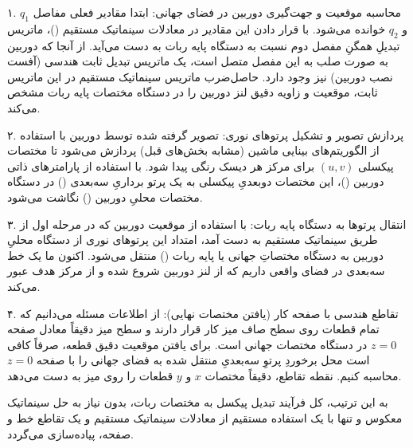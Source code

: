 \documentclass{article}
\begin{document}
۱. محاسبه موقعیت و جهت‌گیری دوربین در فضای جهانی:
ابتدا مقادیر فعلی مفاصل $ q_1 $ و $ q_2 $ خوانده می‌شود. با قرار دادن این مقادیر در معادلات سینماتیک مستقیم ()، ماتریس تبدیلِ همگنِ مفصل دوم نسبت به دستگاه پایه ربات به دست می‌آید. از آنجا که دوربین به صورت صلب به این مفصل متصل است، یک ماتریس تبدیل ثابت هندسی (آفست نصب دوربین) نیز وجود دارد. حاصل‌ضرب ماتریس سینماتیک مستقیم در این ماتریس ثابت، موقعیت و زاویه دقیق لنز دوربین را در دستگاه مختصات پایه ربات مشخص می‌کند.

۲. پردازش تصویر و تشکیل پرتوهای نوری:
تصویر گرفته شده توسط دوربین با استفاده از الگوریتم‌های بینایی ماشین (مشابه بخش‌های قبل) پردازش می‌شود تا مختصات پیکسلی $ (u, v) $ برای مرکز هر دیسک رنگی پیدا شود. با استفاده از پارامترهای ذاتی دوربین ()، این مختصات دوبعدیِ پیکسلی به یک پرتو برداریِ سه‌بعدی () در دستگاه مختصات محلیِ دوربین () نگاشت می‌شود.

۳. انتقال پرتوها به دستگاه پایه ربات:
با استفاده از موقعیت دوربین که در مرحله اول از طریق سینماتیک مستقیم به دست آمد، امتداد این پرتوهای نوری از دستگاه محلیِ دوربین به دستگاه مختصاتِ جهانی یا پایه ربات () منتقل می‌شود. اکنون ما یک خط سه‌بعدی در فضای واقعی داریم که از لنز دوربین شروع شده و از مرکز هدف عبور می‌کند.

۴. تقاطع هندسی با صفحه کار (یافتن مختصات نهایی):
از اطلاعات مسئله می‌دانیم که تمام قطعات روی سطح صاف میز کار قرار دارند و سطح میز دقیقاً معادل صفحه $ z = 0 $ در دستگاه مختصات جهانی است. برای یافتن موقعیت دقیق قطعه، صرفاً کافی است محل برخوردِ پرتوِ سه‌بعدیِ منتقل شده به فضای جهانی را با صفحه $ z = 0 $ محاسبه کنیم. نقطه تقاطع، دقیقاً مختصات $ x $ و $ y $ قطعات را روی میز به دست می‌دهد. 

به این ترتیب، کل فرآیند تبدیل پیکسل به مختصات ربات، بدون نیاز به حل سینماتیک معکوس و تنها با یک استفاده مستقیم از معادلات سینماتیک مستقیم و یک تقاطع خط و صفحه، پیاده‌سازی می‌گردد.
\end{document}

